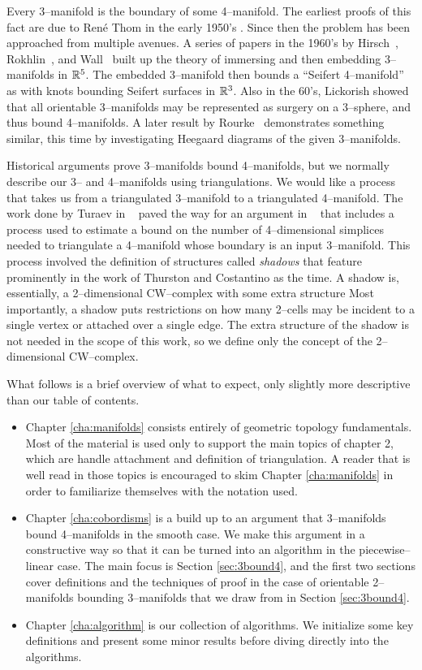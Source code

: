 Every 3--manifold is the boundary of some 4--manifold.
The earliest proofs of this fact are due to Ren\'e Thom in the early 1950's \cite{Thom}.
Since then the problem has been approached from multiple avenues.
A series of papers in the 1960's by Hirsch~\cite{Hirsch61}, Rokhlin~\cite{Rokhlin65}, and Wall~\cite{Wall65} built up the theory of immersing and then embedding 3--manifolds in $\mathbb{R}^5$.
The embedded 3--manifold then bounds a ``Seifert 4--manifold'' as with knots bounding Seifert surfaces in $\mathbb{R}^3$.
Also in the 60's, Lickorish showed that all orientable 3--manifolds may be represented as surgery on a 3--sphere, and thus bound 4--manifolds.
A later result by Rourke~\cite{Rourke85} demonstrates something similar, this time by investigating Heegaard diagrams of the given 3--manifolds.

Historical arguments prove 3--manifolds bound 4--manifolds, but we normally describe our 3-- and 4--manifolds using triangulations.
We would like a process that takes us from a triangulated 3--manifold to a triangulated 4--manifold.
The work done by Turaev in ~\cite{Turaev91} paved the way for an argument in ~\cite{CostThur08} that includes a process used to estimate a bound on the number of 4--dimensional simplices needed to triangulate a 4--manifold whose boundary is an input 3--manifold.
This process involved the definition of structures called \emph{shadows} that feature prominently in the work of Thurston and Costantino as the time.
A shadow is, essentially, a 2--dimensional CW--complex with some extra structure
Most importantly, a shadow puts restrictions on how many 2--cells may be incident to a single vertex or attached over a single edge.
The extra structure of the shadow is not needed in the scope of this work, so we define only the concept of the 2--dimensional CW--complex.

What follows is a brief overview of what to expect, only slightly more descriptive than our table of contents.
\begin{itemize}
	\item Chapter \ref{cha:manifolds} consists entirely of geometric topology fundamentals.
	Most of the material is used only to support the main topics of chapter 2, which are handle attachment and definition of triangulation.
	A reader that is well read in those topics is encouraged to skim Chapter \ref{cha:manifolds} in order to familiarize themselves with the notation used.
	\item Chapter \ref{cha:cobordisms} is a build up to an argument that 3--manifolds bound 4--manifolds in the smooth case.
	We make this argument in a constructive way so that it can be turned into an algorithm in the piecewise--linear case.
	The main focus is Section \ref{sec:3bound4}, and the first two sections cover definitions and the techniques of proof in the case of orientable 2--manifolds bounding 3--manifolds that we draw from in Section \ref{sec:3bound4}.
	\item Chapter \ref{cha:algorithm} is our collection of algorithms.
	We initialize some key definitions and present some minor results before diving directly into the algorithms.
\end{itemize}